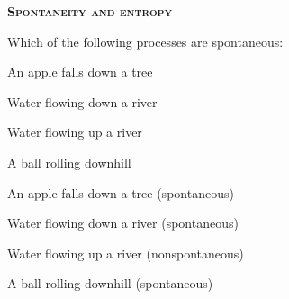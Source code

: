 \documentclass[main.tex]{subfiles}
\begin{document}
\newpage
\setdoublesep{0.35700 em}  %
\setatomsep{1.78500 em}    %
\setbondoffset{0.18265 em} %
\newcommand{\bondwidth}{0.06642 em} %
\setbondstyle{line width = \bondwidth}
\fancyhfoffset[E,O]{0pt}
\setlength{\columnsep}{30pt}
\begin{conclusion}
\end{conclusion}
\begin{multicols*}{2}\setcounter{numA}{1}

{\raggedright\textsc{\textbf{Spontaneity and entropy}}\par}


\begin{question}[ID=\the\value{numA}]
Which of the following processes are spontaneous:
\begin{inparaenum}[(a)]
\item An apple falls down a tree %
\item Water flowing down a river %
\item Water flowing up a river %
\item A ball rolling downhill %
 \end{inparaenum}
\end{question}
\begin{solution}
\begin{inparaenum}[(a)]
\item An apple falls down a tree   (spontaneous)
\item Water flowing down a river   (spontaneous)
\item Water flowing up a river   (nonspontaneous)
\item A ball rolling downhill   (spontaneous)
\end{inparaenum}
\hspace{0.1cm}\end{solution}%


\end{multicols*}
\end{document}
